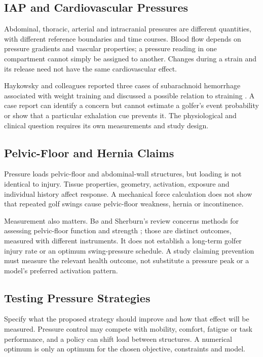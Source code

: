 \subsection{IAP and Cardiovascular Pressures}

Abdominal, thoracic, arterial and intracranial pressures are different quantities, with different reference boundaries and time courses. Blood flow depends on pressure gradients and vascular properties; a pressure reading in one compartment cannot simply be assigned to another. Changes during a strain and its release need not have the same cardiovascular effect.

Haykowsky and colleagues reported three cases of subarachnoid hemorrhage associated with weight training and discussed a possible relation to straining \citep{Haykowsky1996SAH}. A case report can identify a concern but cannot estimate a golfer's event probability or show that a particular exhalation cue prevents it. The physiological and clinical question requires its own measurements and study design.

\subsection{Pelvic-Floor and Hernia Claims}

Pressure loads pelvic-floor and abdominal-wall structures, but loading is not identical to injury. Tissue properties, geometry, activation, exposure and individual history affect response. A mechanical force calculation does not show that repeated golf swings cause pelvic-floor weakness, hernia or incontinence.

Measurement also matters. B{\o} and Sherburn's review concerns methods for assessing pelvic-floor function and strength \citep{Bo2005PelvicFloor}; those are distinct outcomes, measured with different instruments. It does not establish a long-term golfer injury rate or an optimum swing-pressure schedule. A study claiming prevention must measure the relevant health outcome, not substitute a pressure peak or a model's preferred activation pattern.

\subsection{Testing Pressure Strategies}

Specify what the proposed strategy should improve and how that effect will be measured. Pressure control may compete with mobility, comfort, fatigue or task performance, and a policy can shift load between structures. A numerical optimum is only an optimum for the chosen objective, constraints and model.


